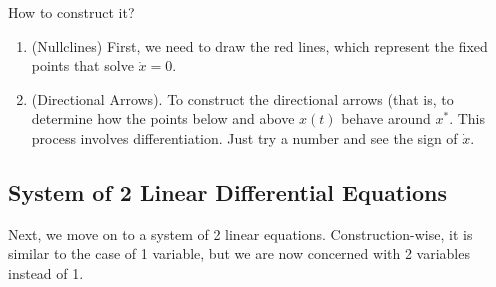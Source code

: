 \documentclass[11pt,a4paper]{book}
\theoremstyle{definition}\newtheorem{definition}{Definition}
\theoremstyle{definition}\newtheorem{fact}{Fact}
\theoremstyle{definition}\newtheorem{remark}{Remark}
\theoremstyle{definition}\newtheorem{ex}{Ex.}
\theoremstyle{definition}\newtheorem{project}{Project}
\theoremstyle{definition}\newtheorem{problem}{Problem}
\theoremstyle{definition}\newtheorem{example}{Example}
\numberwithin{theorem}{section}
\numberwithin{corollary}{chapter}
\numberwithin{assumption}{chapter}
\numberwithin{definition}{chapter}
\numberwithin{prop}{chapter}
\numberwithin{notation}{chapter}
\numberwithin{problem}{chapter}
\numberwithin{example}{chapter}
\numberwithin{fact}{chapter}
\numberwithin{ex}{chapter}
\begin{document}
	
	How to construct it?
	\begin{enumerate}
		\item (Nullclines) First, we need to draw the red lines, which represent the fixed points that solve $\dot{x} = 0$. 
		\item (Directional Arrows). To construct the directional arrows (that is, to determine how the points below and above $x(t)$ behave around $x^*$. This process involves differentiation. Just try a number and see the sign of $\dot{x}$.
	\end{enumerate}
	
	\subsection{System of 2 Linear Differential Equations} 
	Next, we move on to a system of 2 linear equations. Construction-wise, it is similar to the case of 1 variable, but we are now concerned with 2 variables instead of 1.
	
\end{document}

